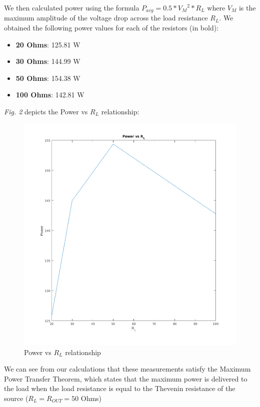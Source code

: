 \documentclass[10pt]{article}
\begin{document}
We then calculated power using the formula $P_{avg}= 0.5 * {V_M}^2 * R_L$ where $V_M$ is the maximum amplitude of the voltage drop across the load resistance $R_L$. We obtained the following power values for each of the resistors (in bold):
\begin{itemize}
	\item \textbf{20 Ohms}: 125.81 W
	\item \textbf{30 Ohms}: 144.99 W
	\item \textbf{50 Ohms}: 154.38 W
	\item \textbf{100 Ohms}: 142.81 W
\end{itemize} 

\textit{Fig. 2} depicts the Power vs $R_L$ relationship:
\begin{center}
	\begin{figure} [H]
		\centering
		\includegraphics[scale=0.4]{images/powerplot.png}
		\caption{Power vs $R_L$ relationship}
	\end{figure}
\end{center}



We can see from our calculations that these measurements satisfy the Maximum Power Transfer Theorem, which states that the maximum power is delivered to the load when the load resistance is equal to the Thevenin resistance of the source ($R_L = R_{OUT} = 50$ Ohms)
\end{document}
